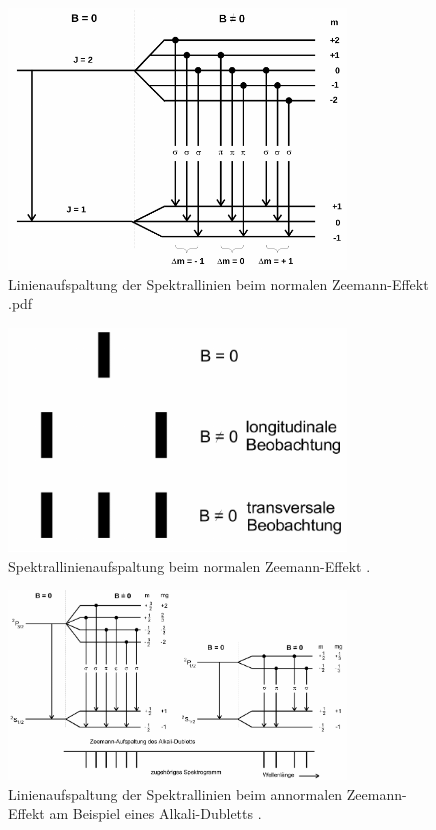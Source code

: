 \begin{figure}[htb]
  \centering
  \includegraphics[width=0.8\textwidth]{images/V27_3.pdf}
  \caption{Linienaufspaltung der Spektrallinien beim normalen Zeemann-Effekt \cite{anleitung}.pdf}
  \label{abb:normal}
\end{figure}

\begin{figure}[htb]
  \centering
  \includegraphics[width=0.8\textwidth]{images/V27_4.pdf}
  \caption{Spektrallinienaufspaltung beim normalen Zeemann-Effekt \cite{anleitung}.}
  \label{abb:spektral}
\end{figure}

\begin{figure}[htb]
  \centering
  \includegraphics[width=0.8\textwidth]{images/V27_5.pdf}
  \caption{Linienaufspaltung der Spektrallinien beim annormalen Zeemann-Effekt am Beispiel eines Alkali-Dubletts \cite{anleitung}.}
  \label{abb:annormal}
\end{figure}
